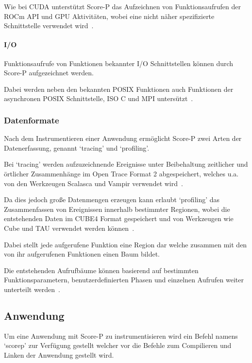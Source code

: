 \documentclass[german,proseminar,hyperref,utf8]{zihpub}
\begin{document}
    Wie bei CUDA unterstützt Score-P das Aufzeichnen von Funktionsaufrufen der ROCm API und GPU Aktivitäten,
    wobei eine nicht näher spezifizierte Schnittstelle verwendet wird~.

    \paragraph{I/O}
    Funktionsaufrufe von Funktionen bekannter I/O Schnittstellen können durch Score-P aufgezeichnet werden.

    Dabei werden neben den bekannten POSIX Funktionen auch Funktionen der asynchronen POSIX Schnittstelle,
    ISO C und MPI untersützt~.

    \subsubsection{Datenformate}
    Nach dem Instrumentieren einer Anwendung ermöglicht Score-P zwei Arten der Datenerfassung,
    genannt `tracing' und `profiling'.

    Bei `tracing' werden aufzuzeichnende Ereignisse unter Beibehaltung zeitlicher und örtlicher
    Zusammenhänge im Open Trace Format 2 abgespeichert, welches u.a. von den Werkzeugen Scalasca
    und Vampir verwendet wird~.

    Da dies jedoch gro{\ss}e Datenmengen erzeugen kann erlaubt `profiling' das Zusammenfassen von
    Ereignissen innerhalb bestimmter Regionen, wobei die entstehenden Daten im CUBE4 Format
    gespeichert und von Werkzeugen wie Cube und TAU verwendet werden
    können~.

    Dabei stellt jede aufgerufene Funktion eine Region dar welche zusammen mit den von ihr
    aufgerufenen Funktionen einen Baum bildet.

    Die entstehenden Aufrufbäume können basierend auf bestimmten Funktionsparametern,
    benutzerdefinierten Phasen und einzelnen Aufrufen weiter unterteilt
    werden~.

    \subsection{Anwendung}
    Um eine Anwendung mit Score-P zu instrumentisieren wird ein Befehl namens `scorep' zur Verfügung
    gestellt welcher vor die Befehle zum Compilieren und Linken der Anwendung gestellt wird.
\end{document}
